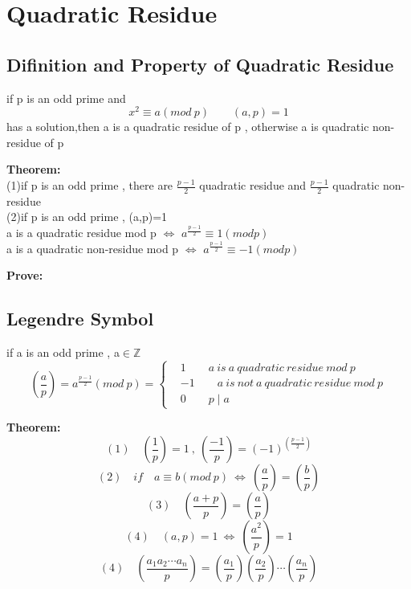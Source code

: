 \documentclass{ctexart}
\begin{document}
\newpage
\section{Quadratic Residue}
\subsection{Difinition and Property of Quadratic Residue}
if p is an odd prime and 
\[x^2\equiv a(mod\ p)\qquad (a,p)=1\]
has a solution,then a is a quadratic residue of p , otherwise a is quadratic non-residue of p

\vspace{12 pt}
\textbf{Theorem:}
\\(1)if p is an odd prime , there are \(\frac{p-1}{2}\) quadratic residue and \(\frac{p-1}{2}\) quadratic non-residue 
\\(2)if p is an odd prime , (a,p)=1 
\\ a is a quadratic residue mod p \(\Leftrightarrow\) \(a^{\frac{p-1}{2}}\equiv 1(mod p)\)
\\ a is a quadratic non-residue mod p \(\Leftrightarrow\) \(a^{\frac{p-1}{2}}\equiv -1(mod p)\)

\vspace{12 pt}
\textbf{Prove:}

\vspace{12 pt}
\subsection{Legendre Symbol}
if a is an odd prime , a\(\in\)\(\mathbb{Z}\)
\[ (\frac{a}{p})=a^{\frac{p-1}{2}}(mod\ p)=
\left\{
\begin{aligned}
&1\qquad a\ is\ a\ quadratic\ residue\ mod\ p\\
&-1\qquad a\ is\ not\ a\ quadratic\ residue\ mod\ p\\
&0\qquad p\mid a
\end{aligned}
\right.
\]

\vspace{12 pt}
\textbf{Theorem:}
\[(1)\quad(\frac{1}{p})=1\ , \ (\frac{-1}{p})=(-1)^{(\frac{p-1}{2})}\]
\[(2)\quad if\quad a\equiv b(mod\ p)\ \Leftrightarrow \ (\frac{a}{p})=(\frac{b}{p})\]
\[(3)\quad  (\frac{a+p}{p})=(\frac{a}{p})   \]
\[(4)\quad  (a,p)=1\ \Leftrightarrow \ (\frac{a^2}{p})=1 \]
\[(4)\quad (\frac{a_1a_2\cdots a_n}{p})=(\frac{a_1}{p})(\frac{a_2}{p})\cdots (\frac{a_n}{p}) \]
\end{document}
